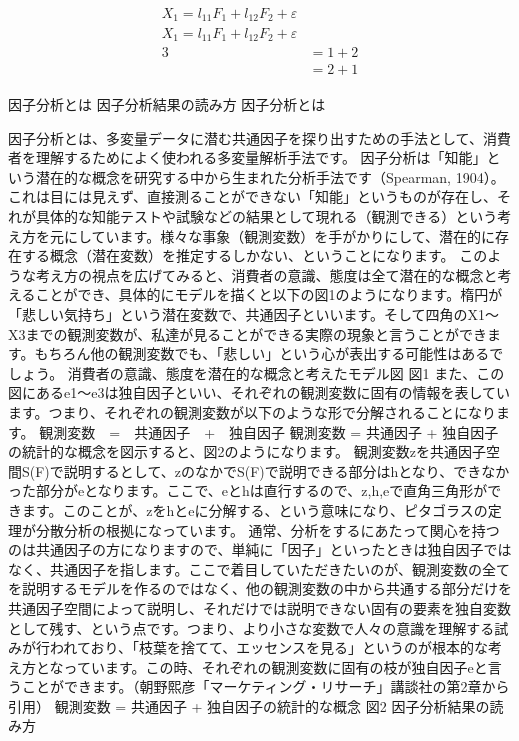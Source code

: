 \documentclass[a4j,11pt,mc, twocolumn]{jreport}
\begin{document}
	\begin{eqnarray}
	\begin{split}
	X_1 =l_{11}F_1+l_{12}F_2+\varepsilon\\
	X_1 =l_{11}F_1+l_{12}F_2+\varepsilon\\
	3&=1+2\\
	&=2+1
	\end{split}
	\end{eqnarray}





%
%
%




	因子分析とは
	因子分析結果の読み方
	因子分析とは

	因子分析とは、多変量データに潜む共通因子を探り出すための手法として、消費者を理解するためによく使われる多変量解析手法です。
	因子分析は「知能」という潜在的な概念を研究する中から生まれた分析手法です（Spearman, 1904）。これは目には見えず、直接測ることができない「知能」というものが存在し、それが具体的な知能テストや試験などの結果として現れる（観測できる）という考え方を元にしています。様々な事象（観測変数）を手がかりにして、潜在的に存在する概念（潜在変数）を推定するしかない、ということになります。
	このような考え方の視点を広げてみると、消費者の意識、態度は全て潜在的な概念と考えることができ、具体的にモデルを描くと以下の図1のようになります。楕円が「悲しい気持ち」という潜在変数で、共通因子といいます。そして四角のX1～X3までの観測変数が、私達が見ることができる実際の現象と言うことができます。もちろん他の観測変数でも、「悲しい」という心が表出する可能性はあるでしょう。
	消費者の意識、態度を潜在的な概念と考えたモデル図
	図1
	また、この図にあるe1～e3は独自因子といい、それぞれの観測変数に固有の情報を表しています。つまり、それぞれの観測変数が以下のような形で分解されることになります。
	観測変数　=　共通因子　+　独自因子
	観測変数 = 共通因子 + 独自因子の統計的な概念を図示すると、図2のようになります。
	観測変数zを共通因子空間S(F)で説明するとして、zのなかでS(F)で説明できる部分はhとなり、できなかった部分がeとなります。ここで、eとhは直行するので、z,h,eで直角三角形ができます。このことが、zをhとeに分解する、という意味になり、ピタゴラスの定理が分散分析の根拠になっています。
	通常、分析をするにあたって関心を持つのは共通因子の方になりますので、単純に「因子」といったときは独自因子ではなく、共通因子を指します。ここで着目していただきたいのが、観測変数の全てを説明するモデルを作るのではなく、他の観測変数の中から共通する部分だけを共通因子空間によって説明し、それだけでは説明できない固有の要素を独自変数として残す、という点です。つまり、より小さな変数で人々の意識を理解する試みが行われており、「枝葉を捨てて、エッセンスを見る」というのが根本的な考え方となっています。この時、それぞれの観測変数に固有の枝が独自因子eと言うことができます。（朝野熙彦「マーケティング・リサーチ」講談社の第2章から引用）
	観測変数 = 共通因子 + 独自因子の統計的な概念
	図2
	因子分析結果の読み方
\end{document}
